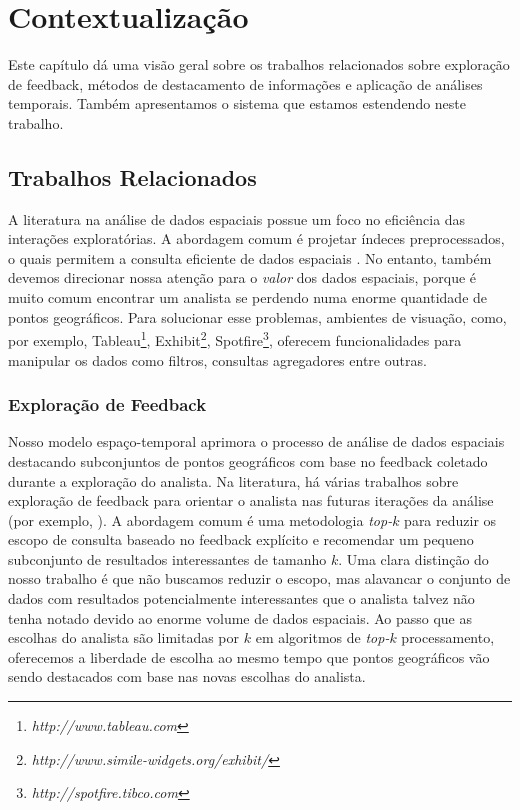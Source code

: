 \chapter{Contextualização}
\label{chap:contextualizacao}

Este capítulo dá uma visão geral sobre os trabalhos relacionados sobre exploração de feedback, métodos de destacamento de informações e aplicação de análises temporais. Também apresentamos o sistema que estamos estendendo neste trabalho.

\section{Trabalhos Relacionados}

A literatura na análise de dados espaciais possue um foco no eficiência das interações exploratórias. A abordagem comum é projetar índeces preprocessados, o quais permitem a consulta eficiente de dados espaciais \cite{lins2013nanocubes}. No entanto, também devemos direcionar nossa atenção para o {\em valor} dos dados espaciais, porque é muito comum encontrar um analista se perdendo numa enorme quantidade de pontos geográficos. Para solucionar esse problemas, ambientes de visuação, como, por exemplo, Tableau\footnote{\it http://www.tableau.com}, Exhibit\footnote{\it http://www.simile-widgets.org/exhibit/}, Spotfire\footnote{\it  http://spotfire.tibco.com}, oferecem funcionalidades para manipular os dados como filtros, consultas agregadores entre outras.

\subsection{Exploração de Feedback}

Nosso modelo espaço-temporal aprimora o processo de análise de dados espaciais destacando subconjuntos de pontos geográficos com base no feedback coletado durante a exploração do analista. Na literatura, há várias trabalhos sobre exploração de feedback para orientar o analista nas futuras iterações da análise (por exemplo, ). A abordagem comum é uma metodologia {\em top-$k$} para reduzir os escopo de consulta baseado no feedback explícito e recomendar um pequeno subconjunto de resultados interessantes de tamanho $k$. Uma clara distinção do nosso trabalho é que não buscamos reduzir o escopo, mas alavancar o conjunto de dados com resultados potencialmente interessantes que o analista talvez não tenha notado devido ao enorme volume de dados espaciais. Ao passo que as escolhas do analista são limitadas por $k$ em algoritmos de {\em top-$k$} processamento, oferecemos a liberdade de escolha ao mesmo tempo que pontos geográficos vão sendo destacados com base nas novas escolhas do analista.

